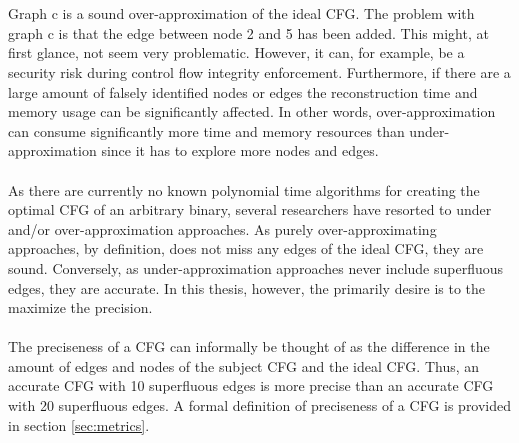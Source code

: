 \documentclass{kththesis}
\begin{document}
\\ \\
Graph c is a sound over-approximation of the ideal CFG. The problem with graph c is that the edge between node 2 and 5 has been added. This might, at first glance, not seem very problematic. However, it can, for example, be a security risk during control flow integrity enforcement. Furthermore, if there are a large amount of falsely identified nodes or edges the reconstruction time and memory usage can be significantly affected. In other words, over-approximation can consume significantly more time and memory resources than under-approximation since it has to explore more nodes and edges\cite{alternating}.
\\ \\
As there are currently no known polynomial time algorithms for creating the optimal CFG of an arbitrary binary, several researchers have resorted to under and/or over-approximation approaches\cite{preciseCFGBoolean}\cite{preciseCFG}\cite{CFGFromPowerPC}\cite{angr}. As purely over-approximating approaches, by definition, does not miss any edges of the ideal CFG, they are sound. Conversely, as under-approximation approaches never include superfluous edges, they are accurate. In this thesis, however, the primarily desire is to the maximize the precision.
\\ \\
The preciseness of a CFG can informally be thought of as the difference in the amount of edges and nodes of the subject CFG and the ideal CFG. Thus, an accurate CFG with 10 superfluous edges is more precise than an accurate CFG with 20 superfluous edges. A formal definition of preciseness of a CFG is provided in section \ref{sec:metrics}.
%
\end{document}
